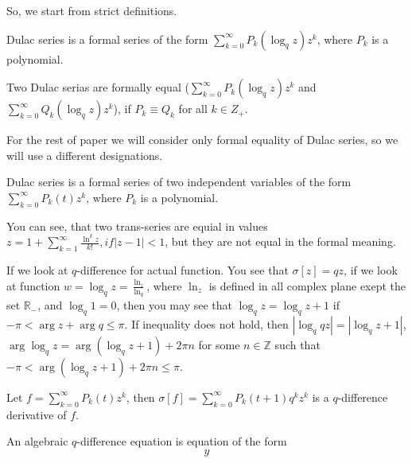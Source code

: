 \documentclass[a4paper, 14pt]{extarticle}
\begin{document}
So, we start from strict definitions.

\begin{definition}
Dulac series is a formal series of the form $\sum_{k=0}^\infty P_k(\log_q z)z^k$, where $P_k$ is a polynomial.    
\end{definition}

\begin{definition}
Two Dulac serias are formally equal ($\sum_{k=0}^\infty P_k(\log_q z)z^k$ and $\sum_{k=0}^\infty Q_k(\log_q z)z^k$), if $P_k \equiv Q_k$ for all $k\in Z_+$.    
\end{definition}

For the rest of paper we will consider only formal equality of Dulac series, so we will use a different designations.

\begin{definition}
Dulac series is a formal series of two independent variables of the form $\sum_{k=0}^\infty P_k(t)z^k$, where $P_k$ is a polynomial.    
\end{definition}

\begin{remark}
    You can see, that two trans-series are equial in values
    $z = 1 + \sum_{k=1}^\infty \frac{\ln^k z}{k!}, if |z-1|<1$, but they are not equal in the formal meaning.
\end{remark}

If we look at $q$-difference for actual function. You see that
$\sigma[z] = qz$, if we look at function $w = \log_q z = \frac{\ln_z}{\ln_q}$, where $\ln_z$ is defined in all complex plane exept the set $\mathbb{R}_-$, and $\log_q 1 = 0$, then you may see that $\log_q z = \log_q z + 1$ if $ -\pi<\arg z + \arg q \leq \pi $. If inequality does not hold, then $|\log_q qz| = |\log_q z + 1|$, $\arg \log_qz = \arg(\log_q z + 1) + 2\pi n$ for some $n\in \mathbb{Z}$ such that $-\pi<\arg(\log_q z + 1) + 2\pi n \leq \pi$.

\begin{definition}
Let $f = \sum_{k=0}^\infty P_k(t)z^k$, then $\sigma[f] =  \sum_{k=0}^\infty P_k(t+1)q^kz^k$ is a $q$-difference derivative of $f$.
\end{definition}



\begin{definition}
    An algebraic $q$-difference equation is equation of the form
    \begin{equation}
        y
    \end{equation}
\end{definition}
\end{document}

